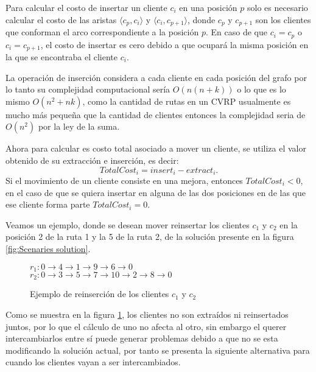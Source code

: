 \documentclass{article}
\begin{document}
Para calcular el costo de insertar un cliente $c_i$ en una posición $p$ solo es necesario calcular el costo de las aristas $\langle c_p,c_i \rangle$ y $\langle c_i,c_{p+1} \rangle$, donde $c_p$ y $c_{p+1}$ son los clientes que conforman el arco correspondiente a la posición $p$. En caso de que $c_i = c_p$ o $c_i = c_{p+1}$, el costo de insertar es cero debido a que ocupará la misma posición en la que se encontraba el cliente $c_i$.

La operación de inserción considera a cada cliente en cada posición del grafo por lo tanto su complejidad computacional sería $O(n(n+k))$ o lo que es lo mismo $O(n^2 + nk)$, como la cantidad de rutas en un CVRP usualmente es mucho más pequeña que la cantidad de clientes entonces la complejidad seria de $O(n^2)$ por la ley de la suma.

Ahora para calcular es costo total asociado a mover un cliente, se utiliza el valor obtenido de su extracción e inserción, es decir:
\[ TotalCost_i = insert_i - extract_i. \] 
 Si el movimiento de un cliente consiste en una mejora, entonces $TotalCost_i < 0$, en el caso de que se quiera insertar en alguna de las dos posiciones en de las que ese cliente forma parte $TotalCost_i = 0$.

Veamos un ejemplo, donde se desean mover reinsertar los clientes $c_1$ y $c_2$ en la posición 2 de la ruta 1 y la 5 de la ruta 2, de la solución presente en la figura \ref{fig:Scenaries solution}.

\begin{figure}[h]
	$r_1:0 \rightarrow 4 \rightarrow 1 \rightarrow 9 \rightarrow 6 \rightarrow 0$ \\
	$r_2:0 \rightarrow 3 \rightarrow 5 \rightarrow 7 \rightarrow 10 \rightarrow 2 \rightarrow 8 \rightarrow 0$ \\
	\caption{Ejemplo de reinserción de los clientes $c_1$ y $c_2$}
	\label{fig:Example-reinsert-clients}
\end{figure} 

Como se muestra en la figura \ref{fig:Example-reinsert-clients}, los clientes no son extraídos ni reinsertados juntos, por lo que el cálculo de uno no afecta al otro, sin embargo el querer intercambiarlos entre sí puede generar problemas debido a que no se esta modificando la solución actual, por tanto se presenta la siguiente alternativa para cuando los clientes vayan a ser intercambiados.
\end{document}
